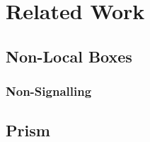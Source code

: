 \documentclass[report.tex]{subfiles}
\begin{document}
\chapter{Related Work} %
\label{cha:related_work}
\section{Non-Local Boxes} %
\label{sec:non_local_boxes}
\subsection{Non-Signalling} %
\label{sub:non_signalling}

\section{Prism} %
\label{sec:prism}


\newpage
\end{document}
